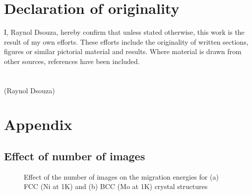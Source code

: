 \documentclass{article}
\begin{document}
\clearpage
\section{Declaration of originality}

I, Raynol Dsouza, hereby confirm that unless stated otherwise, this work is the result of my own efforts. These efforts include the originality of written sections, figures or similar pictorial material and results. Where material is drawn from other sources, references have been included. \\
\\
\\
\flushright(Raynol Dsouza)


\newpage
 


\newpage
\section{Appendix}

\subsection{Effect of number of images}

\begin{figure}[!htp]
\centering
{}
\hfill
\caption{Effect of the number of images on the migration energies for (a) FCC (Ni at 1K) and (b) BCC (Mo at 1K) crystal structures}
\label{fig:23}
\end{figure}
\end{document}
